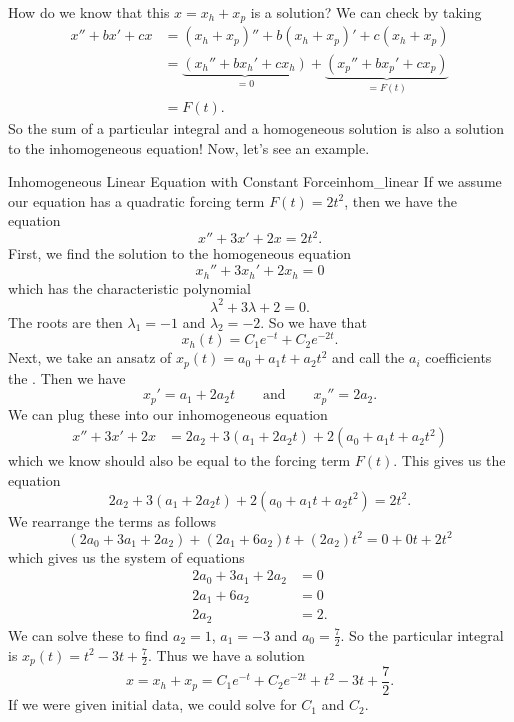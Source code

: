         How do we know that this $x=x_h+x_p$ is a solution? We can check by taking
        \begin{align*}
            x''+bx'+cx&=(x_h+x_p)''+b(x_h+x_p)'+c(x_h+x_p)\\
            &= \underbrace{(x_h''+bx_h'+cx_h)}_{=0}+\underbrace{(x_p''+bx_p'+cx_p)}_{=F(t)}\\
            &=F(t).
        \end{align*}
        So the sum of a particular integral and a homogeneous solution is also a solution to the inhomogeneous equation! Now, let's see an example.

        \begin{ex}{Inhomogeneous Linear Equation with Constant Force}{inhom_linear}
        If we assume our equation has a quadratic forcing term $F(t)=2t^2$, then we have the equation
        \[
        x''+3x'+2x=2t^2.
        \]
        First, we find the solution to the homogeneous equation
        \[
        x_h''+3x_h'+2x_h=0
        \]
        which has the characteristic polynomial
        \[
        \lambda^2+3\lambda+2=0.
        \]
        The roots are then $\lambda_1=-1$ and $\lambda_2=-2.$ So we have that
        \[
        x_h(t)=C_1e^{-t}+C_2e^{-2t}.
        \]
        Next, we take an ansatz of $x_p(t)=a_0+a_1t+a_2t^2$ and call the $a_i$ coefficients the .  Then we have
        \[
        x_p'=a_1+2a_2t \qquad \textrm{and} \qquad x_p''=2a_2.
        \]
        We can plug these into our inhomogeneous equation
        \begin{align*}
        x''+3x'+2x&= 2a_2+3(a_1+2a_2t)+2(a_0+a_1t+a_2t^2)
        \end{align*}
        which we know should also be equal to the forcing term $F(t)$.  This gives us the equation
        \[
        2a_2+3(a_1+2a_2t)+2(a_0+a_1t+a_2t^2)=2t^2.
        \]
        We rearrange the terms as follows
        \[
        (2a_0+3a_1+2a_2)+(2a_1+6a_2)t+(2a_2)t^2=0+0t+2t^2
        \]
        which gives us the system of equations
        \begin{align*}
            2a_0+3a_1+2a_2&=0\\
            2a_1+6a_2&=0\\
            2a_2&=2.
        \end{align*}
        We can solve these to find $a_2=1$, $a_1=-3$ and $a_0=\frac{7}{2}$. So the particular integral is $x_p(t)=t^2-3t+\frac{7}{2}$.  Thus we have a solution
        \[
        x=x_h+x_p=C_1e^{-t}+C_2e^{-2t}+t^2-3t+\frac{7}{2}.
        \]
        If we were given initial data, we could solve for $C_1$ and $C_2$.
        \end{ex}


